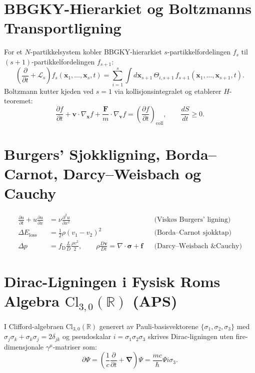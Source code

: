 \documentclass[11pt,a4paper,oneside]{book}
\theoremstyle{definition}
\begin{document}
\section{BBGKY-Hierarkiet og Boltzmanns Transportligning}
For et $N$-partikkelsystem kobler BBGKY-hierarkiet $s$-partikkelfordelingen $f_s$ til $(s+1)$-partikkelfordelingen $f_{s+1}$:
\begin{equation}
\left(\frac{\partial}{\partial t} + \mathcal{L}_s\right)f_s(\mathbf{x}_1,\dots,\mathbf{x}_s,t) = \sum_{i=1}^s \int d\mathbf{x}_{s+1}\,\Theta_{i,s+1}\,f_{s+1}(\mathbf{x}_1,\dots,\mathbf{x}_{s+1},t).
\end{equation}
Boltzmann kutter kjeden ved $s=1$ via kollisjonsintegralet og etablerer $H$-teoremet:
\begin{equation}
\frac{\partial f}{\partial t} + \mathbf{v}\cdot\nabla_{\mathbf{x}}f + \frac{\mathbf{F}}{m}\cdot\nabla_{\mathbf{v}}f = \left(\frac{\partial f}{\partial t}\right)_{\text{coll}}, \qquad \frac{dS}{dt} \ge 0.
\end{equation}

\section{Burgers' Sjokkligning, Borda--Carnot, Darcy--Weisbach og Cauchy}
\begin{align}
\frac{\partial u}{\partial t} + u\frac{\partial u}{\partial x} &= \nu\frac{\partial^2 u}{\partial x^2} && \text{(Viskøs Burgers' ligning)} \\
\Delta E_{\text{loss}} &= \frac{1}{2}\rho(v_1 - v_2)^2 && \text{(Borda--Carnot sjokktap)} \\
\Delta p &= f_{\text{D}}\frac{L}{D}\frac{\rho v^2}{2}, \qquad \rho\frac{D\mathbf{v}}{Dt} = \nabla\cdot\boldsymbol{\sigma} + \mathbf{f} && \text{(Darcy--Weisbach \& Cauchy)}
\end{align}

\section{Dirac-Ligningen i Fysisk Roms Algebra $\text{Cl}_{3,0}(\mathbb{R})$ (APS)}
I Clifford-algebraen $\text{Cl}_{3,0}(\mathbb{R})$ generert av Pauli-basisvektorene $\{\sigma_1,\sigma_2,\sigma_3\}$ med $\sigma_j\sigma_k + \sigma_k\sigma_j = 2\delta_{jk}$ og pseudoskalar $i = \sigma_1\sigma_2\sigma_3$ skrives Dirac-ligningen uten fire-dimensjonale $\gamma^\mu$-matriser som:
\begin{equation}
\boxed{\partial\Psi = \left(\frac{1}{c}\frac{\partial}{\partial t} + \boldsymbol{\nabla}\right)\Psi = \frac{mc}{\hbar}\Psi i\sigma_3.}
\end{equation}
\end{document}
